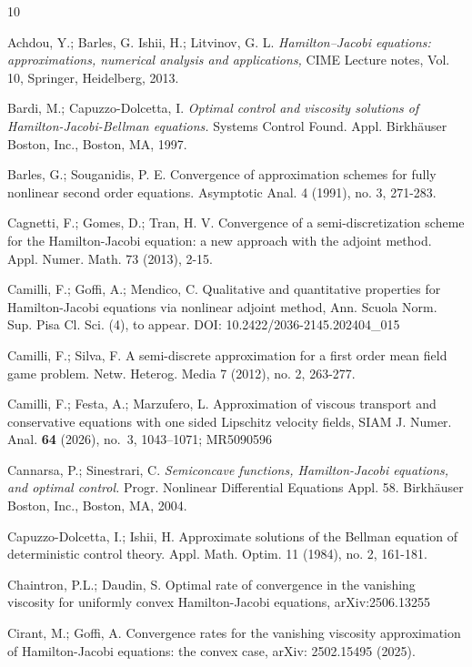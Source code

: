 \documentclass[11pt]{amsart}
\theoremstyle{remark}
\theoremstyle{definition}
\theoremstyle{Claim}
\theoremstyle{plain}
\begin{document}
	\begin{thebibliography}{10}
	
	 Achdou, Y.; Barles, G.  Ishii,  H.;  Litvinov, G. L.  \textit{Hamilton–Jacobi equations: approximations, numerical analysis and applications,} CIME Lecture notes, Vol. 10, Springer, Heidelberg, 2013.
	
	
		Bardi, M.; Capuzzo-Dolcetta, I.
		\textit{Optimal control and viscosity solutions of Hamilton-Jacobi-Bellman equations.}
		Systems Control Found. Appl. Birkhäuser Boston, Inc., Boston, MA, 1997. 
		
		
		Barles, G.; Souganidis, P. E. Convergence of approximation schemes for fully nonlinear second order equations. Asymptotic Anal. 4 (1991), no. 3, 271-283.
		
		Cagnetti, F.; Gomes, D.; Tran, H. V.
		Convergence of a semi-discretization scheme for the Hamilton-Jacobi equation: a new approach with the adjoint method. 
		Appl. Numer. Math. 73 (2013), 2-15.
		
		Camilli, F.; Goffi, A.; Mendico, C.
		Qualitative and quantitative properties for Hamilton-Jacobi equations via nonlinear adjoint method,  Ann. Scuola Norm. Sup. Pisa Cl. Sci. (4), to appear. DOI: 10.2422/2036-2145.202404\_015
		
		
		Camilli, F.; Silva, F.
		A semi-discrete approximation for a first order mean field game problem.
		Netw. Heterog. Media 7 (2012), no. 2, 263-277.
		
		 Camilli, F.;  Festa, A.; Marzufero, L. Approximation of viscous transport and conservative equations with one sided Lipschitz velocity fields, SIAM J. Numer. Anal. {\bf  64} (2026), no.~3, 1043--1071; MR5090596
		
		  Cannarsa, P.; Sinestrari, C.
		\textit{Semiconcave functions, Hamilton-Jacobi equations, and optimal control.}
		Progr. Nonlinear Differential Equations Appl.  58. Birkhäuser Boston, Inc., Boston, MA, 2004.
		
		Capuzzo-Dolcetta, I.; Ishii, H.
		Approximate solutions of the Bellman equation of deterministic control theory.
		Appl. Math. Optim. 11 (1984), no. 2, 161-181.
		
		Chaintron, P.L.; Daudin, S.	Optimal rate of convergence in the vanishing viscosity for uniformly convex Hamilton-Jacobi equations, arXiv:2506.13255 
		
		Cirant, M.; Goffi, A. Convergence rates for the vanishing viscosity approximation of Hamilton-Jacobi equations: the convex case, arXiv: 2502.15495 (2025).
		

\end{thebibliography}
\end{document}
